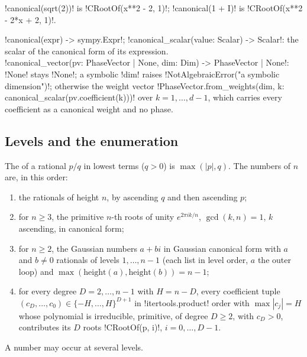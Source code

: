 \begin{example}
\py!canonical(sqrt(2))! is \code!CRootOf(x**2 - 2, 1)!; \py!canonical(1 + I)! is \code!CRootOf(x**2 - 2*x + 2, 1)!.
\end{example}

\begin{signature}
\py!canonical(expr) -> sympy.Expr!; \py!canonical_scalar(value: Scalar) -> Scalar!: the scalar of the canonical form of its expression.\\
\py!canonical_vector(pv: PhaseVector | None, dim: Dim) -> PhaseVector | None!: \py!None! stays \py!None!; a symbolic \code!dim! raises \py!NotAlgebraicError("a symbolic dimension")!; otherwise the weight vector \py!PhaseVector.from_weights(dim, {k: canonical_scalar(pv.coefficient(k))})! over $k=1,\ldots,d-1$, which carries every coefficient as a canonical weight and no phase.
\end{signature}

\subsection{Levels and the enumeration}

\begin{definition}\label{def:algebra-level}
The  of a rational $p/q$ in lowest terms ($q>0$) is $\max(|p|,q)$. The numbers of  $n$ are, in this order:
\begin{enumerate}
\item the rationals of height $n$, by ascending $q$ and then ascending $p$;
\item for $n\ge 3$, the primitive $n$-th roots of unity $e^{2\pi ik/n}$, $\gcd(k,n)=1$, $k$ ascending, in canonical form;
\item for $n\ge 2$, the Gaussian numbers $a+bi$ in Gaussian canonical form with $a$ and $b\ne 0$ rationals of levels $1,\ldots,n-1$ (each list in level order, $a$ the outer loop) and $\max(\mathrm{height}(a),\mathrm{height}(b))=n-1$;
\item for every degree $D=2,\ldots,n-1$ with $H=n-D$, every coefficient tuple $(c_D,\ldots,c_0)\in\{-H,\ldots,H\}^{D+1}$ in \py!itertools.product! order with $\max|c_j|=H$ whose polynomial is irreducible, primitive, of degree $D\ge2$, with $c_D>0$, contributes its $D$ roots \py!CRootOf(p, i)!, $i=0,\ldots,D-1$.
\end{enumerate}
A number may occur at several levels.
\end{definition}


